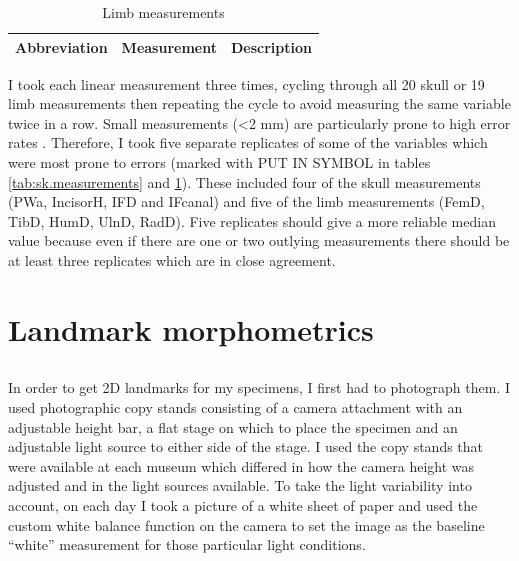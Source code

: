 \begin{table}[h]
\caption[Description of the limb measurements]
		{Limb measurements} %
\begin{tabular}{lll}
\hline
\textbf{Abbreviation} & \textbf{Measurement} & \textbf{Description}\\
\hline
\hline

\end{tabular}
\label{tab:limb.measurements}
\end{table}


I took each linear measurement three times, cycling through all 20 skull or 19 limb measurements then repeating the cycle to avoid measuring the same variable twice in a row. Small measurements (<2 mm) are particularly prone to high error rates \citep{Cardini2008}. Therefore, I took five separate replicates of some of the variables which were most prone to errors (marked with PUT IN SYMBOL in tables \ref{tab:sk.measurements} and \ref{tab:limb.measurements}). These included four of the skull measurements (PWa, IncisorH, IFD and IFcanal) and five of the limb measurements (FemD, TibD, HumD, UlnD, RadD). 
Five replicates should give a more reliable median value because even if there are one or two outlying measurements there should be at least three replicates which are in close agreement.

\section{Landmark morphometrics}
\subsection{}
In order to get 2D landmarks for my specimens, I first had to photograph them. I used photographic copy stands consisting of a camera attachment with an adjustable height bar, a flat stage on which to place the specimen and an adjustable light source to either side of the stage. I used the copy stands that were available at each museum which differed in how the camera height was adjusted and in the light sources available.
To take the light variability into account, on each day I took a picture of a white sheet of paper and used the custom white balance function on the camera to set the image as the baseline “white” measurement for those particular light conditions.

